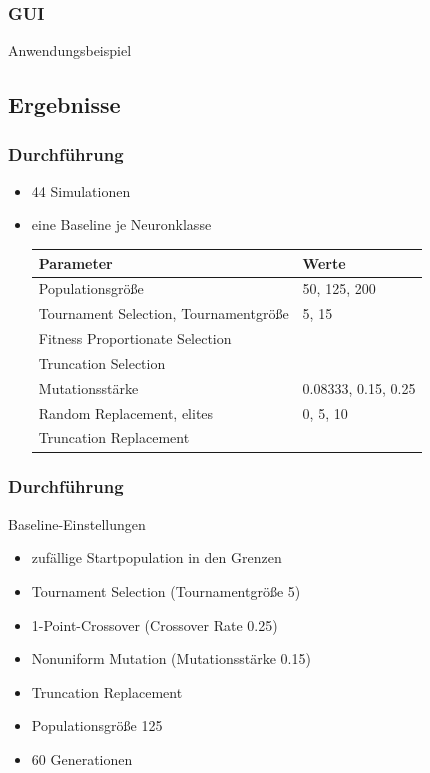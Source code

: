 \begin{frame}
  \frametitle{GUI}
  \center
  \LARGE
  Anwendungsbeispiel
\end{frame}

\subsection{Ergebnisse}

\begin{frame}
  \frametitle{Durchführung}
  \begin{itemize}
  \item 44 Simulationen
  \item eine Baseline je Neuronklasse
    \scriptsize
    \begin{tabular}[H]{ll}
      Parameter & Werte \\\hline
      Populationsgröße & 50, 125, 200 \\ \arrayrulecolor{light-gray}\hline
      Tournament Selection, Tournamentgröße & 5, 15 \\
      Fitness Proportionate Selection & \\
      Truncation Selection  & \\ \hline
      Mutationsstärke & 0.08333, 0.15, 0.25 \\ \hline
      Random Replacement, elites & 0, 5, 10 \\
      Truncation Replacement & \\
    \end{tabular}
  \end{itemize}
\end{frame}

\begin{frame}
  \frametitle{Durchführung}
  Baseline-Einstellungen
  \begin{itemize}
    \item zufällige Startpopulation in den Grenzen
    \item Tournament Selection (Tournamentgröße 5)
    \item 1-Point-Crossover (Crossover Rate 0.25)
    \item Nonuniform Mutation (Mutationsstärke 0.15)
    \item Truncation Replacement
    \item Populationsgröße 125
    \item 60 Generationen
  \end{itemize}
\end{frame}


